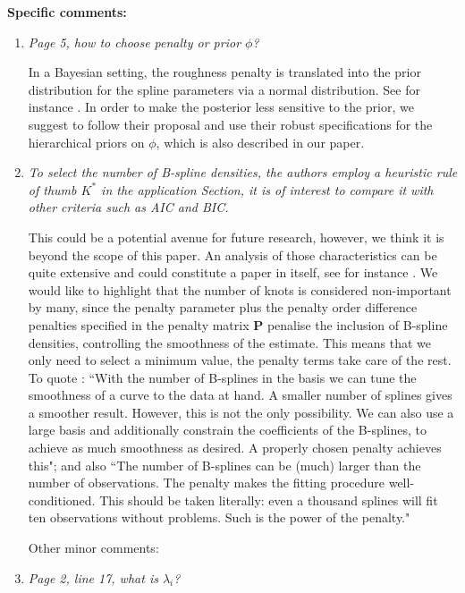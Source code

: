 \documentclass{scrartcl}
\newcommand{\refereeQuote}{\textit }
\newcommand{\response}{}
\begin{document}
\textbf{Specific comments:}
\begin{enumerate}
	\item \refereeQuote{ Page 5, how to choose penalty or prior $\phi$?}
	
	\response{In a Bayesian setting, the roughness penalty is translated into the prior distribution for the spline parameters via a normal distribution.  See for instance \cite{Bremhorst:2016}.  In order to make the posterior less sensitive to the prior, we suggest to follow their proposal and use their robust specifications for the hierarchical priors on $\phi$, which is also described in our paper. }
	
	\item \refereeQuote{To select the number of B-spline densities, the authors employ a heuristic rule of thumb $K^*$ in the application Section, it is of interest to compare it with other criteria such as AIC and BIC.}\smallskip
	
	\response{This could be a potential avenue for future research, however, we think it is beyond the scope of this paper.  An analysis of those characteristics can be quite extensive and could constitute a paper in itself, see for instance \cite{Likhachev2017}.  We would like to highlight that the number of knots is considered non-important by many, since the penalty parameter plus the penalty order difference penalties specified in the penalty matrix $\textbf{P}$ penalise the inclusion of B-spline densities, controlling the smoothness of the estimate.  This means that we only need to select a minimum value, the penalty terms take care of the rest. To quote \cite{Eilers2015}: ``With the number of B-splines in the basis we can tune the smoothness of a curve to
the data at hand. A smaller number of splines gives a smoother result. However, this is not the only possibility. We can also use a large basis and additionally constrain the
coefficients of the B-splines, to achieve as much smoothness as desired. A properly
chosen penalty achieves this"; and also ``The number of B-splines can be (much) larger than the number of observations. The
penalty makes the fitting procedure well-conditioned. This should be taken literally:
even a thousand splines will fit ten observations without problems. Such is the power
of the penalty."}\bigskip
	
	Other minor comments: \bigskip
	
	\item \refereeQuote{Page 2, line 17, what is $\lambda_i$?}\smallskip
	

\end{enumerate}
\end{document}
